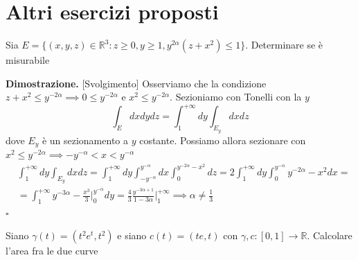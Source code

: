 \chapter{Altri esercizi proposti}
\pagestyle{plain}
\thispagestyle{empty}
\pagestyle{fancy}
\vspace{0.5cm}
\begin{exercise}
	Sia $E=\{(x, y, z) \in \mathbb{R}^3 : z \geq 0, y \geq 1, y^{2 \alpha}(z + x^2) \leq 1 \}$. Determinare se è misurabile
\end{exercise}

\noindent \textbf{Dimostrazione. } [Svolgimento]
	Osserviamo che la condizione $z + x^2 \leq y^{-2 \alpha} \implies 0 \leq y^{-2\alpha}$ e $x^2 \leq y^{-2 \alpha}$. Sezioniamo con Tonelli con la $y$
	$$
	\int_E dxdydz = \int_1^{+\infty} dy \int_{E_y} dxdz
	$$
	dove $E_y$ è un sezionamento a $y$ costante. Possiamo allora sezionare con $x^2 \leq y^{-2\alpha} \implies -y^{-\alpha} < x < y^{-\alpha}$
	\begin{align*}
	&\int_1^{+\infty} dy \int_{E_y} dxdz = \int_1^{+\infty} dy \int_{-y^{-\alpha}}^{y^{-\alpha}} dx \int_0^{y^{-2 \alpha} - x^2} dz = 2 \int_1^{+\infty} dy \int_0^{y^{-\alpha}} y^{-2 \alpha} - x^2 dx = \\
	&=\int_1^{+\infty} y^{-3 \alpha} - \frac{x^3}{3}\Bigg|_0^{y^{-\alpha}} dy = \frac{4}{3} \frac{y^{-3\alpha + 1}}{1 - 3 \alpha}\Bigg|_1^{+\infty} \implies \alpha \neq \frac{1}{3}
	\end{align*}
\hfill $\square$
\vspace{0.5cm}
\begin{exercise}
Siano $\gamma(t)=(t^2 e^t, t^2)$ e siano $c(t)=(te, t)$ con $\gamma, c:[0,1] \to \mathbb{R}$. Calcolare l'area fra le due curve
\end{exercise}

